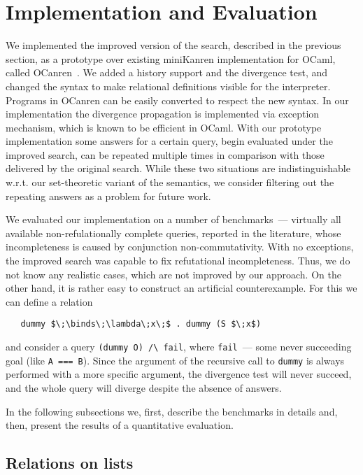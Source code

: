 \section{Implementation and Evaluation}
\label{evaluation}

We implemented the improved version of the search, described in the previous section, 
as a prototype over existing miniKanren implementation for OCaml, called OCanren~\cite{OCanren}. 
We added a history support and the divergence test, and changed the syntax to make relational definitions
visible for the interpreter. Programs in OCanren can be easily converted to respect the new syntax.
In our implementation the divergence propagation is implemented via exception mechanism, which is
known to be efficient in OCaml. With our prototype implementation some answers for a certain query, begin
evaluated under the improved search, can be repeated multiple times in comparison with those delivered by the
original search. While these two situations are indistinguishable w.r.t. our set-theoretic variant of the semantics,
we consider filtering out the repeating answers as a problem for future work.

We evaluated our implementation on a number of benchmarks~--- virtually all available non-refulationally
complete queries, reported in the literature, whose incompleteness is caused by conjunction non-commutativity.
With no exceptions, the improved search was capable to fix refutational incompleteness. Thus, we do not know any
realistic cases, which are not improved by our approach. On the other hand, it is rather easy to construct
an artificial counterexample. For this we can define a relation

\begin{lstlisting}
   dummy $\;\binds\;\lambda\;x\;$ . dummy (S $\;x$)
\end{lstlisting}

\noindent and consider a query \lstinline|(dummy O) /\ fail|, where \lstinline|fail|~--- some never
succeeding goal (like \lstinline|A === B|). Since the argument of the recursive call to \lstinline|dummy| is
always performed with a more specific argument, the divergence test will never succeed, and the whole
query will diverge despite the absence of answers. 

In the following subsections we, first, describe the benchmarks in details and, then, present the
results of a quantitative evaluation.

\subsection{Relations on lists}

